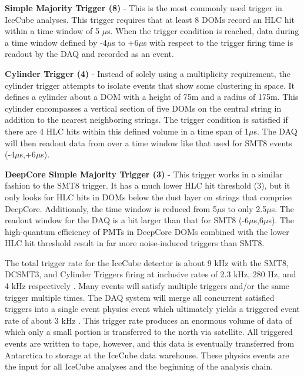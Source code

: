 \documentclass{gatech-thesis}
\begin{document}
\begin{adjustwidth}{2.5em}{2.5em}
\setlength{\parindent}{0pt}
\textbf{Simple Majority Trigger (8)} - This is the most commonly used trigger in IceCube analyses. This trigger requires that at least 8 DOMs record an HLC hit within a time window of 5 $\mu$s. When the trigger condition is reached, data during a time window defined by -4$\mu$s to +6$\mu$s with respect to the trigger firing time is readout by the DAQ and recorded as an event.

\textbf{Cylinder Trigger (4)} - Instead of solely using a multiplicity requirement, the cylinder trigger attempts to isolate events that show some clustering in space. It defines a cylinder about a DOM with a height of 75m and a radius of 175m. This cylinder encompasses a vertical section of five DOMs on the central string in addition to the nearest neighboring strings. The trigger condition is satisfied if there are 4 HLC hits within this defined volume in a time span of 1$\mu$s. The DAQ will then readout data from over a time window like that used for SMT8 events (-4$\mu$s,+6$\mu$s).

\textbf{DeepCore Simple Majority Trigger (3)} - This trigger works in a similar fashion to the SMT8 trigger. It has a much lower HLC hit threshold (3), but it only looks for HLC hits in DOMs below the dust layer on strings that comprise DeepCore. Additionaly, the time window is reduced from 5$\mu$s to only 2.5$\mu$s. The readout window for the DAQ is a bit larger than that for SMT8 (-6$\mu$s,6$\mu$s). The high-quantum efficiency of PMTs in DeepCore DOMs combined with the lower HLC hit threshold result in far more noise-induced triggers than SMT8.
\end{adjustwidth}
\setlength{\parindent}{17.5pt}

The total trigger rate for the IceCube detector is about 9 kHz with the SMT8, DCSMT3, and Cylinder Triggers firing at inclusive rates of 2.3 kHz, 280 Hz, and 4 kHz respectively \cite{I3Live}. Many events will satisfy multiple triggers and/or the same trigger multiple times. The DAQ system will merge all concurrent satisfied triggers into a single event physics event which ultimately yields a triggered event rate of about 3 kHz \cite{I3Live}. This trigger rate produces an enormous volume of data of which only a small portion is transferred to the north via satellite. All triggered events are written to tape, however, and this data is eventually transferred from Antarctica to storage at the IceCube data warehouse. These physics events are the input for all IceCube analyses and the beginning of the analysis chain.
\end{document}
